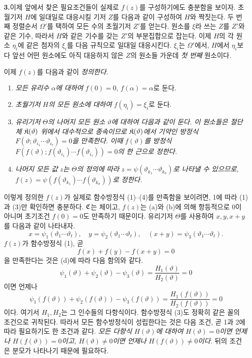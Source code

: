 \medskip
\noindent\textbf{3.}\quad 이제 앞에서 찾은 필요조건들이 실제로 \(f(z)\)를 구성하기에도 충분함을 보이자. 초월기저 \(H\)에 일대일로 대응시킬 기저 \(Z\)를 다음과 같이 구성하여 \(H\)와 짝짓는다. 두 번째 정렬순서 \(\Omega'\)를 택하여 모든 수의 초월기저 \(Z'\)를 얻는다. 원소를 \(\xi\)라 쓰는 \(Z\)를 \(Z'\)와 같은 기수, 따라서 \(H\)와 같은 기수를 갖는 \(Z'\)의 부분집합으로 잡는다. 이제 \(H\)의 각 원소 \(\eta_i\)에 같은 첨자의 \(\xi_i\)를 다음 규칙으로 일대일 대응시킨다. \(\xi_i\)는 \(\Omega'\)에서, \(H\)에서 \(\eta_i\)보다 앞선 어떤 원소에도 아직 대응하지 않은 \(Z\)의 원소들 가운데 \emph{첫 번째} 원소이다.

이제 \(f(z)\)를 다음과 같이 \emph{정의한다.}
\begin{enumerate}
\item[(a)] \emph{모든 유리수} \(\alpha\)\emph{에 대하여} \(f(0)=0\), \(f(\alpha)=\alpha\)로 둔다.
\item[(b)] \emph{초월기저} \(H\)\emph{의 모든 원소에 대하여} \(f(\eta_i)=\xi_i\)로 둔다.
\item[(c)] \emph{유리기저} \(\Theta\)\emph{의 나머지 모든 원소} \(\vartheta\)\emph{에 대하여 다음과 같이 둔다. 이 원소들은 절단체} \(\mathfrak K(\vartheta)\) \emph{위에서 대수적으로 종속이므로} \(\mathfrak K(\vartheta)\)\emph{에서 기약인 방정식} \(F(\vartheta;\vartheta_{i_1}\cdots\vartheta_{i_\tau})=0\)\emph{을 만족한다. 이때} \(f(\vartheta)\)\emph{를 방정식} \(F(f(\vartheta);f(\vartheta_{i_1})\cdots f(\vartheta_{i_\tau}))=0\)\emph{의 한 근으로 정한다.}
\item[(d)] \emph{나머지 모든 값} \(z\)\emph{는} \(\Theta\)\emph{의 정의에 따라} \(z=\psi(\vartheta_{k_1}\cdots\vartheta_{k_\sigma})\)\emph{로 나타낼 수 있으므로,} \(f(z)=\psi(f(\vartheta_{k_1})\cdots f(\vartheta_{k_\sigma}))\)\emph{로 정한다.}
\end{enumerate}
이렇게 정의한 \(f(z)\)가 실제로 함수방정식 (1)--(4)를 만족함을 보이려면, 1에 따라 (1)과 (3)만 확인하면 충분하다. \(\mathfrak C\)는 체이고, \(f(z)\)는 (a)와 (b)에 의해 항등적으로 0이 아니며 초기조건 \(f(0)=0\)도 만족하기 때문이다. 유리기저 \(\Theta\)를 사용하여 \(x,y,x+y\)를 다음과 같이 나타내자.
\[
x=\psi_1(\vartheta_1\cdots\vartheta_t),\quad
y=\psi_2(\vartheta_1\cdots\vartheta_t),\quad
(x+y)=\psi_3(\vartheta_1\cdots\vartheta_t).
\]
\(f(z)\)가 함수방정식 (1), 곧
\[
f(x)+f(y)-f(x+y)=0
\]
을 만족한다는 것은 (d)에 따라 다음 함의와 같다.
\[
\psi_1(\vartheta)+\psi_2(\vartheta)-\psi_3(\vartheta)
=\frac{H_1(\vartheta)}{H_2(\vartheta)}=0
\]
이면 언제나
\[
\psi_1(f(\vartheta))+\psi_2(f(\vartheta))-\psi_3(f(\vartheta))
=\frac{H_1(f(\vartheta))}{H_2(f(\vartheta))}=0
\]
이다. 여기서 \(H_1,H_2\)는 그 인수들의 다항식이다. 함수방정식 (3)도 정확히 같은 꼴의 조건으로 귀착된다. 따라서 모든 함수방정식이 성립한다는 것은 다음 조건, 곧 1과 2에 따라 필요하기도 한 조건과 같다. \emph{모든 다항식 \(H(\vartheta)\)에 대하여 \(H(\vartheta)=0\)이면 언제나 \(H(f(\vartheta))=0\)이고, \(H(\vartheta)\ne0\)이면 언제나 \(H(f(\vartheta))\ne0\)이다.} 뒤의 조건은 분모가 나타나기 때문에 필요하다.

